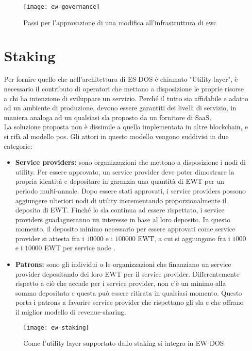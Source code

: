 \begin{figure}[h]
    \texttt{[image: ew-governance]}
    \centering
    \caption{Passi per l'approvazione di una modifica all'infrastruttura di \gls{ewc} \cite{img:ew-governance}}
    \label{lab:ew-governance}
\end{figure}


\section{Staking}
\label{sec:staking}
Per fornire quello che nell'architettura di ES-DOS è chiamato "Utility layer", è necessario il contributo di operatori che mettano a disposizione le proprie risorse a chi ha intenzione di sviluppare un servizio.
Perché il tutto sia affidabile e adatto ad un ambiente di produzione, devono essere garantiti dei livelli di servizio, in maniera analoga ad un qualsiasi \gls{sla} proposto da un fornitore di SaaS. \\
La soluzione proposta non è dissimile a quella implementata in altre blockchain, e si rifà al modello \gls{pos}.
Gli attori in questo modello vengono suddivisi in due categorie:

\begin{itemize}
    \item \textbf{Service providers:} sono organizzazioni che mettono a disposizione i nodi di utility.
          Per essere approvato, un service provider deve poter dimostrare la propria identità e depositare in garanzia una quantità di EWT per un periodo multi-annale.
          Dopo essere stati approvati, i service providers possono aggiungere ulteriori nodi di utility incrementando proporzionalmente il deposito di EWT.
          Finché lo \gls{sla} continua ad essere rispettato, i service providers guadagneranno un interesse in base al loro deposito.
          In questo momento, il deposito minimo necessario per essere approvati come service provider si attesta fra i $10000$ e i $100000$ EWT, a cui si aggiungono fra i $1000$ e i $10000$ EWT per service node \cite{art:ew-staking}.
    \item \textbf{Patrons:} sono gli individui o le organizzazioni che finanziano un service provider depositando dei loro EWT per il service provider.
          Differentemente rispetto a ciò che accade per i service provider, non c'è un minimo alla somma depositata e questa può essere ritirata in qualsiasi momento.
          Questo porta i patrons a favorire service provider che rispettano gli \gls{sla} e che offrano il miglior modello di revenue-sharing.
\end{itemize}

\begin{figure}[h]
    \texttt{[image: ew-staking]}
    \centering
    \caption{Come l'utility layer supportato dallo staking si integra in EW-DOS \cite{art:ew-staking}}
    \label{lab:ew-staking}
\end{figure}
